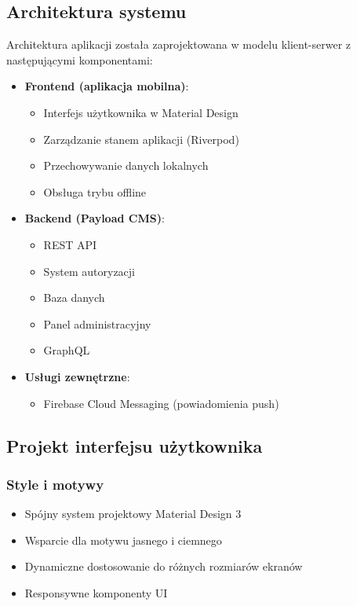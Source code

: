 \subsection{Architektura systemu}
Architektura aplikacji została zaprojektowana w modelu klient-serwer z następującymi komponentami:

\begin{itemize}
  \item \textbf{Frontend (aplikacja mobilna)}:
        \begin{itemize}
          \item Interfejs użytkownika w Material Design
          \item Zarządzanie stanem aplikacji (Riverpod)
          \item Przechowywanie danych lokalnych
          \item Obsługa trybu offline
        \end{itemize}

  \item \textbf{Backend (Payload CMS)}:
        \begin{itemize}
          \item REST API
          \item System autoryzacji
          \item Baza danych
          \item Panel administracyjny
          \item GraphQL
        \end{itemize}

  \item \textbf{Usługi zewnętrzne}:
        \begin{itemize}
          \item Firebase Cloud Messaging (powiadomienia push)
        \end{itemize}
\end{itemize}

\subsection{Projekt interfejsu użytkownika}

\subsubsection{Style i motywy}
\begin{itemize}
  \item Spójny system projektowy Material Design 3
  \item Wsparcie dla motywu jasnego i ciemnego
  \item Dynamiczne dostosowanie do różnych rozmiarów ekranów
  \item Responsywne komponenty UI
\end{itemize}

